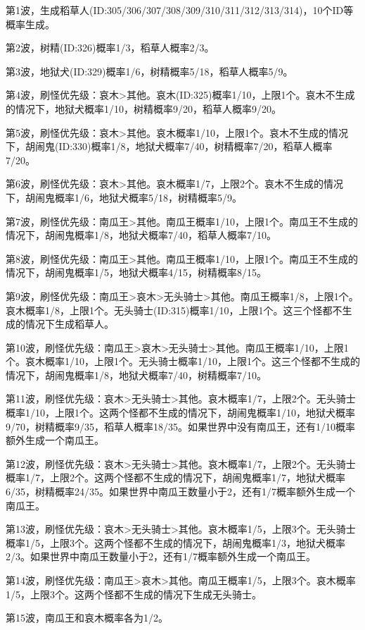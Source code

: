 第1波，生成稻草人(ID:305/306/307/308/309/310/311/312/313/314)，10个ID等概率生成。

第2波，树精(ID:326)概率1/3，稻草人概率2/3。

第3波，地狱犬(ID:329)概率1/6，树精概率5/18，稻草人概率5/9。

第4波，刷怪优先级：哀木>其他。哀木(ID:325)概率1/10，上限1个。哀木不生成的情况下，地狱犬概率1/10，树精概率9/20，稻草人概率9/20。

第5波，刷怪优先级：哀木>其他。哀木概率1/10，上限1个。哀木不生成的情况下，胡闹鬼(ID:330)概率1/8，地狱犬概率7/40，树精概率7/20，稻草人概率7/20。

第6波，刷怪优先级：哀木>其他。哀木概率1/7，上限2个。哀木不生成的情况下，胡闹鬼概率1/6，地狱犬概率5/18，树精概率5/9。

第7波，刷怪优先级：南瓜王>其他。南瓜王概率1/10，上限1个。南瓜王不生成的情况下，胡闹鬼概率1/8，地狱犬概率7/40，稻草人概率7/10。

第8波，刷怪优先级：南瓜王>其他。南瓜王概率1/10，上限1个。南瓜王不生成的情况下，胡闹鬼概率1/5，地狱犬概率4/15，树精概率8/15。

第9波，刷怪优先级：南瓜王>哀木>无头骑士>其他。南瓜王概率1/8，上限1个。哀木概率1/8，上限1个。无头骑士(ID:315)概率1/10，上限1个。这三个怪都不生成的情况下生成稻草人。

第10波，刷怪优先级：南瓜王>哀木>无头骑士>其他。南瓜王概率1/10，上限1个。哀木概率1/10，上限1个。无头骑士概率1/10，上限1个。这三个怪都不生成的情况下，胡闹鬼概率1/8，地狱犬概率7/40，树精概率7/10。

第11波，刷怪优先级：哀木>无头骑士>其他。哀木概率1/7，上限2个。无头骑士概率1/10，上限1个。这两个怪都不生成的情况下，胡闹鬼概率1/10，地狱犬概率9/70，树精概率9/35，稻草人概率18/35。如果世界中没有南瓜王，还有1/10概率额外生成一个南瓜王。

第12波，刷怪优先级：哀木>无头骑士>其他。哀木概率1/7，上限2个。无头骑士概率1/7，上限2个。这两个怪都不生成的情况下，胡闹鬼概率1/7，地狱犬概率6/35，树精概率24/35。如果世界中南瓜王数量小于2，还有1/7概率额外生成一个南瓜王。

第13波，刷怪优先级：哀木>无头骑士>其他。哀木概率1/5，上限3个。无头骑士概率1/5，上限3个。这两个怪都不生成的情况下，胡闹鬼概率1/3，地狱犬概率2/3。如果世界中南瓜王数量小于2，还有1/7概率额外生成一个南瓜王。

第14波，刷怪优先级：南瓜王>哀木>其他。南瓜王概率1/5，上限3个。哀木概率1/5，上限3个。这两个怪都不生成的情况下生成无头骑士。

第15波，南瓜王和哀木概率各为1/2。

